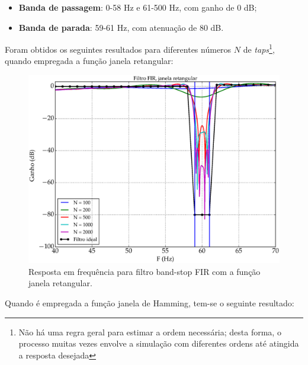 \begin{itemize}
\item{\textbf{Banda de passagem}}: 0-58 Hz e 61-500 Hz, com ganho de 0 dB;
\item{\textbf{Banda de parada}}: 59-61 Hz, com atenuação de 80 dB.
\end{itemize}

Foram obtidos os seguintes resultados para diferentes números $N$ de \textit{taps}\footnote{Não há uma regra geral para estimar a ordem necessária; desta forma, o processo muitas vezes envolve a simulação com diferentes ordens até atingida a resposta desejada}, quando empregada a função janela retangular:

\begin{figure}[H]
  \centering
  \includegraphics[scale=0.55]{images/plots/bandstop_FIR_rectangular_window}
  \caption{Resposta em frequência para filtro band-stop FIR com a função janela retangular.}
  \label{fig:bandstop_FIR_rectangular}
\end{figure}

\newpage
Quando é empregada a função janela de Hamming, tem-se o seguinte resultado:

